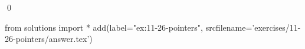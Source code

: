 
\begin{ex}
  \label{ex:11-26-pointers}
  
  \qed
\end{ex}
\begin{python0}
from solutions import *
add(label="ex:11-26-pointers",
    srcfilename='exercises/11-26-pointers/answer.tex')
\end{python0}
